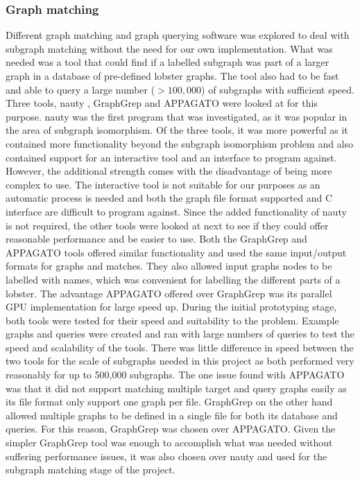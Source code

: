 \subsubsection{Graph matching}
Different graph matching and graph querying software was explored to deal with subgraph matching without the need for our own implementation. What was needed was a tool that could find if a labelled subgraph was part of a larger graph in a database of pre-defined lobster graphs. The tool also had to be fast and able to query a large number ($> 100,000$) of subgraphs with sufficient speed. Three tools, nauty \cite{nauty}, GraphGrep \cite{graphgrep} and APPAGATO \cite{appagato} were looked at for this purpose. 
\n
nauty was the first program that was investigated, as it was popular in the area of subgraph isomorphism. Of the three tools, it was more powerful as it contained more functionality beyond the subgraph isomorphism problem and also contained support for an interactive tool and an interface to program against. However, the additional strength comes with the disadvantage of being more complex to use. The interactive tool is not suitable for our purposes as an automatic process is needed and both the graph file format supported and C interface are difficult to program against. Since the added functionality of nauty is not required, the other tools were looked at next to see if they could offer reasonable performance and be easier to use.
\n
Both the GraphGrep and APPAGATO tools offered similar functionality and used the same input/output formats for graphs and matches. They also allowed input graphs nodes to be labelled with names, which was convenient for labelling the different parts of a lobster. The advantage APPAGATO offered over GraphGrep was its parallel GPU implementation for large speed up. During the initial prototyping stage, both tools were tested for their speed and suitability to the problem. Example graphs and queries were created and ran with large numbers of queries to test the speed and scalability of the tools. There was little difference in speed between the two tools for the scale of subgraphs needed in this project as both performed very reasonably for up to 500,000 subgraphs. The one issue found with APPAGATO was that it did not support matching multiple target and query graphs easily as its file format only support one graph per file. GraphGrep on the other hand allowed multiple graphs to be defined in a single file for both its database and queries. For this reason, GraphGrep was chosen over APPAGATO. 
\n
Given the simpler GraphGrep tool was enough to accomplish what was needed without suffering performance issues, it was also chosen over nauty and used for the subgraph matching stage of the project.

